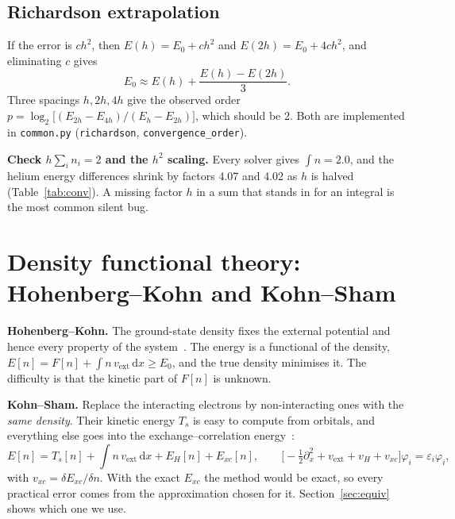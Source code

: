 \documentclass[11pt,a4paper]{article}
\newcommand{\dd}{\,\mathrm{d}}
\begin{document}
\subsection{Richardson extrapolation}

If the error is $ch^2$, then $E(h)=E_0+ch^2$ and $E(2h)=E_0+4ch^2$, and eliminating $c$ gives
\begin{equation}
  E_0\approx E(h)+\frac{E(h)-E(2h)}{3}.
\end{equation}
Three spacings $h,2h,4h$ give the observed order $p=\log_2\!\big[(E_{2h}-E_{4h})/(E_h-E_{2h})\big]$, which should be 2.
Both are implemented in \texttt{common.py} (\texttt{richardson}, \texttt{convergence\_order}).

\begin{insight}
\textbf{Check $h\sum_i n_i=2$ and the $h^2$ scaling.} Every solver gives $\int n=2.0$, and the helium
energy differences shrink by factors 4.07 and 4.02 as $h$ is halved (Table~\ref{tab:conv}). A missing factor $h$
in a sum that stands in for an integral is the most common silent bug.
\end{insight}

\section{Density functional theory: Hohenberg--Kohn and Kohn--Sham}\label{sec:dft}

\textbf{Hohenberg--Kohn.} The ground-state density fixes the external potential and hence every property of
the system~\cite{kohn}. The energy is a functional of the density, $E[n]=F[n]+\int n\,v_\text{ext}\dd x\ge E_0$, and the
true density minimises it. The difficulty is that the kinetic part of $F[n]$ is unknown.

\textbf{Kohn--Sham.} Replace the interacting electrons by non-interacting ones with the \emph{same density}. Their
kinetic energy $T_s$ is easy to compute from orbitals, and everything else goes into the exchange--correlation
energy~\cite{kohn,capelle,harrison}:
\begin{equation}
  E[n]=T_s[n]+\int n\,v_\text{ext}\dd x+E_H[n]+E_{xc}[n],\qquad
  \Big[-\tfrac12\partial_x^2+v_\text{ext}+v_H+v_{xc}\Big]\varphi_i=\varepsilon_i\varphi_i,
\end{equation}
with $v_{xc}=\delta E_{xc}/\delta n$. With the exact $E_{xc}$ the method would be exact, so every practical error comes
from the approximation chosen for it. Section~\ref{sec:equiv} shows which one we use.
\end{document}
